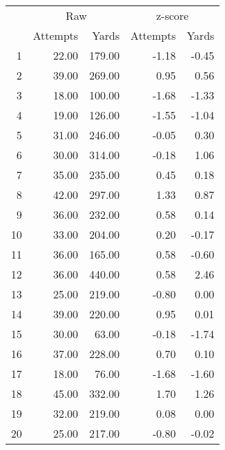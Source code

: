 \documentclass{exam}
\begin{document}
  \begin{table}[H]
    \centering
    \begin{tabular}{rrrrr}
      \toprule
         & \multicolumn{2}{c}{Raw} & \multicolumn{2}{c}{z-score } \\
      \cmidrule(r){2-3} \cmidrule(r){4-5} 
         & Attempts & Yards  & Attempts & Yards \\
      \midrule
      1  & 22.00    & 179.00 & -1.18    & -0.45 \\
      2  & 39.00    & 269.00 & 0.95     & 0.56 \\
      3  & 18.00    & 100.00 & -1.68    & -1.33 \\
      4  & 19.00    & 126.00 & -1.55    & -1.04 \\
      5  & 31.00    & 246.00 & -0.05    & 0.30 \\
      6  & 30.00    & 314.00 & -0.18    & 1.06 \\
      7  & 35.00    & 235.00 & 0.45     & 0.18 \\
      8  & 42.00    & 297.00 & 1.33     & 0.87 \\
      9  & 36.00    & 232.00 & 0.58     & 0.14 \\
      10 & 33.00    & 204.00 & 0.20     & -0.17 \\
      11 & 36.00    & 165.00 & 0.58     & -0.60 \\
      12 & 36.00    & 440.00 & 0.58     & 2.46 \\
      13 & 25.00    & 219.00 & -0.80    & 0.00 \\
      14 & 39.00    & 220.00 & 0.95     & 0.01 \\
      15 & 30.00    & 63.00  & -0.18    & -1.74 \\
      16 & 37.00    & 228.00 & 0.70     & 0.10 \\
      17 & 18.00    & 76.00  & -1.68    & -1.60 \\
      18 & 45.00    & 332.00 & 1.70     & 1.26 \\
      19 & 32.00    & 219.00 & 0.08     & 0.00 \\
      20 & 25.00    & 217.00 & -0.80    & -0.02 \\
      \bottomrule
    \end{tabular}
  \end{table}

\end{document}
